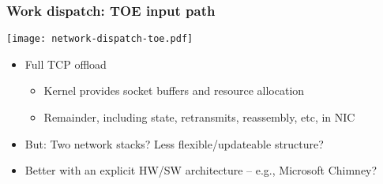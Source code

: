 \begin{frame}
  \frametitle{Work dispatch: TOE input path}

  \begin{center}
    \texttt{[image: network-dispatch-toe.pdf]}
  \end{center}

  \vspace{-0.5cm}
  \pause

  \begin{small}
  \begin{itemize}
    \item Full TCP offload
    \begin{itemize}
      \item Kernel provides socket buffers and resource allocation
      \item Remainder, including state, retransmits, reassembly, etc, in NIC
    \end{itemize}

    \smallskip
    \pause

    \item But: Two network stacks?  Less flexible/updateable structure?
    \item Better with an explicit HW/SW architecture -- e.g., Microsoft Chimney?
  \end{itemize}
  \end{small}
\end{frame}

%

%
%


